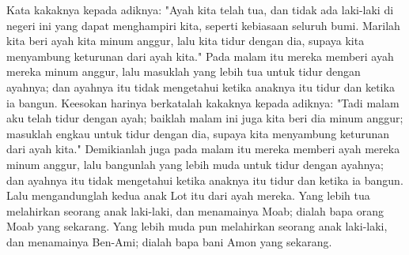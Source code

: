 \begin{biblechapter}
\verse Kata kakaknya kepada adiknya: "Ayah kita telah tua, dan tidak ada laki-laki di negeri ini yang dapat menghampiri kita, seperti kebiasaan seluruh bumi.
\verse Marilah kita beri ayah kita minum anggur, lalu kita tidur dengan dia, supaya kita menyambung keturunan dari ayah kita."
\verse Pada malam itu mereka memberi ayah mereka minum anggur, lalu masuklah yang lebih tua untuk tidur dengan ayahnya; dan ayahnya itu tidak mengetahui ketika anaknya itu tidur dan ketika ia bangun.
\verse Keesokan harinya berkatalah kakaknya kepada adiknya: "Tadi malam aku telah tidur dengan ayah; baiklah malam ini juga kita beri dia minum anggur; masuklah engkau untuk tidur dengan dia, supaya kita menyambung keturunan dari ayah kita."
\verse Demikianlah juga pada malam itu mereka memberi ayah mereka minum anggur, lalu bangunlah yang lebih muda untuk tidur dengan ayahnya; dan ayahnya itu tidak mengetahui ketika anaknya itu tidur dan ketika ia bangun.
\verse Lalu mengandunglah kedua anak Lot itu dari ayah mereka.
\verse Yang lebih tua melahirkan seorang anak laki-laki, dan menamainya Moab; dialah bapa orang Moab yang sekarang.
\verse Yang lebih muda pun melahirkan seorang anak laki-laki, dan menamainya Ben-Ami; dialah bapa bani Amon yang sekarang.
\end{biblechapter}

